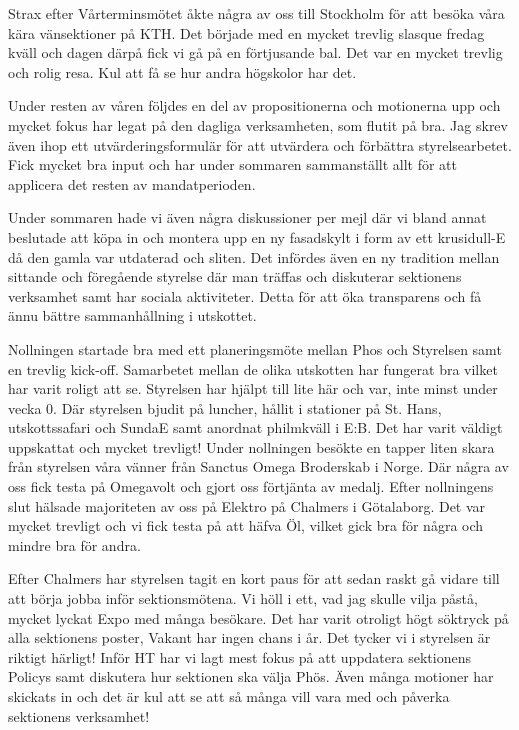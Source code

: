 \documentclass[../_main/handlingar.tex]{subfiles}
\begin{document}
Strax efter Vårterminsmötet åkte några av oss till Stockholm för att besöka våra kära vänsektioner på KTH. Det började med en mycket trevlig slasque fredag kväll och dagen därpå fick vi gå på en förtjusande bal. Det var en mycket trevlig och rolig resa. Kul att få se hur andra högskolor har det.

Under resten av våren följdes en del av propositionerna och motionerna upp och mycket fokus har legat på den dagliga verksamheten, som flutit på bra. Jag skrev även ihop ett utvärderingsformulär för att utvärdera och förbättra styrelsearbetet. Fick mycket bra input och har under sommaren sammanställt allt för att applicera det resten av mandatperioden.

Under sommaren hade vi även några diskussioner per mejl där vi bland annat beslutade att köpa in och montera upp en ny fasadskylt i form av ett krusidull-E då den gamla var utdaterad och sliten. Det infördes även en ny tradition mellan sittande och föregående styrelse där man träffas och diskuterar sektionens verksamhet samt har sociala aktiviteter. Detta för att öka transparens och få ännu bättre sammanhållning i utskottet.

Nollningen startade bra med ett planeringsmöte mellan Phos och Styrelsen samt en trevlig kick-off. Samarbetet mellan de olika utskotten har fungerat bra vilket har varit roligt att se. Styrelsen har hjälpt  till lite här och var, inte minst under vecka 0. Där styrelsen bjudit på luncher, hållit i stationer på St. Hans, utskottssafari och SundaE samt anordnat philmkväll i E:B. Det har varit väldigt uppskattat och mycket trevligt! Under nollningen besökte en tapper liten skara från styrelsen våra vänner från Sanctus Omega Broderskab i Norge. Där några av oss fick testa på Omegavolt och gjort oss förtjänta av medalj. Efter nollningens slut hälsade majoriteten av oss på Elektro på Chalmers i Götalaborg. Det var mycket trevligt och vi fick testa på att häfva Öl, vilket gick bra för några och mindre bra för andra.

Efter Chalmers har styrelsen tagit en kort paus för att sedan raskt gå vidare till att börja jobba inför sektionsmötena. Vi höll i ett, vad jag skulle vilja påstå, mycket lyckat Expo med många besökare. Det har varit otroligt högt söktryck på alla sektionens poster, Vakant har ingen chans i år. Det tycker vi i styrelsen är riktigt härligt! Inför HT har vi lagt mest fokus på att uppdatera sektionens Policys samt diskutera hur sektionen ska välja Phös. Även många motioner har skickats in och det är kul att se att så många vill vara med och påverka sektionens verksamhet!
\end{document}
